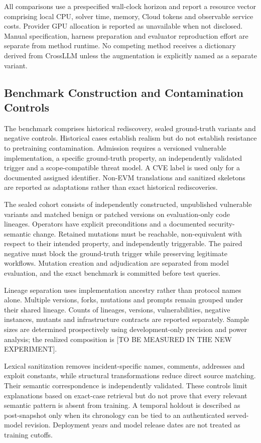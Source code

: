 \documentclass[journal]{IEEEtran}
\theoremstyle{definition}
\newcommand{\CrossTBD}{\textnormal{[TO BE MEASURED IN THE NEW EXPERIMENT]}}
\begin{document}
All comparisons use a prespecified wall-clock horizon and report a resource vector comprising local CPU, solver time, memory, Cloud tokens and observable service costs. Provider GPU allocation is reported as unavailable when not disclosed. Manual specification, harness preparation and evaluator reproduction effort are separate from method runtime. No competing method receives a dictionary derived from CrossLLM unless the augmentation is explicitly named as a separate variant.

\subsection{Benchmark Construction and Contamination Controls}

The benchmark comprises historical rediscovery, sealed ground-truth variants and negative controls. Historical cases establish realism but do not establish resistance to pretraining contamination. Admission requires a versioned vulnerable implementation, a specific ground-truth property, an independently validated trigger and a scope-compatible threat model. A CVE label is used only for a documented assigned identifier. Non-EVM translations and sanitized skeletons are reported as adaptations rather than exact historical rediscoveries.

The sealed cohort consists of independently constructed, unpublished vulnerable variants and matched benign or patched versions on evaluation-only code lineages. Operators have explicit preconditions and a documented security-semantic change. Retained mutations must be reachable, non-equivalent with respect to their intended property, and independently triggerable. The paired negative must block the ground-truth trigger while preserving legitimate workflows. Mutation creation and adjudication are separated from model evaluation, and the exact benchmark is committed before test queries.

Lineage separation uses implementation ancestry rather than protocol names alone. Multiple versions, forks, mutations and prompts remain grouped under their shared lineage. Counts of lineages, versions, vulnerabilities, negative instances, mutants and infrastructure contracts are reported separately. Sample sizes are determined prospectively using development-only precision and power analysis; the realized composition is \CrossTBD.

Lexical sanitization removes incident-specific names, comments, addresses and exploit constants, while structural transformations reduce direct source matching. Their semantic correspondence is independently validated. These controls limit explanations based on exact-case retrieval but do not prove that every relevant semantic pattern is absent from training. A temporal holdout is described as post-snapshot only when its chronology can be tied to an authenticated served-model revision. Deployment years and model release dates are not treated as training cutoffs.
\end{document}
